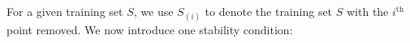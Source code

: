 For a given training set $S$, 
we use $S_{(i)}$ to denote the training set $S$ 
with the $i^{\text{th}}$ point removed.
We now introduce one stability condition:




